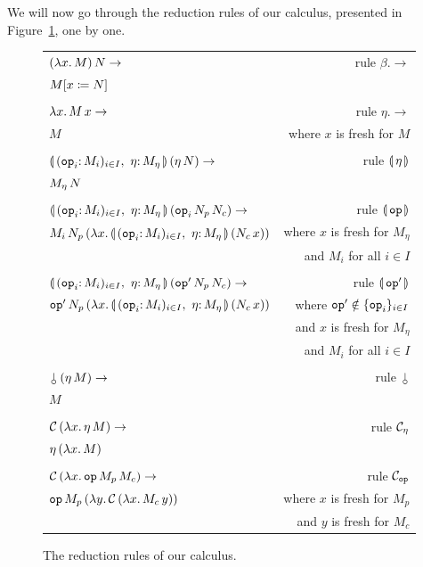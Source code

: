 We will now go through the reduction rules of our calculus, presented in
Figure~\ref{fig:reductions}, one by one.


\begin{figure}
  \centering
  \begin{tabular}{lr}
  $(\lambda x.\, M)\,N \to$ & rule $\beta.\to$ \\
  $M[x \coloneqq N]$ & \\
  \\
  $\lambda x.\, M\,x \to$ & rule $\eta.\to$ \\
  $M$ & where $x$ is fresh for $M$ \\
  \\
  $\ap{\cibanana}{(\ap{\eta}{N})} \to$ & rule $\llparenthesis \, \eta \, \rrparenthesis$ \\
  $M_\eta\,N$ & \\
  \\
  $\ap{\cibanana}{(\ap{\ap{\op{op}_i}{N_p}}{N_c})} \to$ & rule $\llparenthesis \, \mathtt{op} \, \rrparenthesis$ \\
  $\ap{M_i}{\ap{N_p}{(\lam{x}{\ap{\cibanana}{(\ap{N_c}{x})}})}}$
  & where $x$ is fresh for $M_\eta$ \\ & and $M_i$ for all $i \in I$ \\
  \\
  $\ap{\cibanana}{(\ap{\ap{\op{op}'}{N_p}}{N_c})} \to$ & rule $\llparenthesis \, \mathtt{op}' \, \rrparenthesis$ \\
  $\ap{\op{op}'}{\ap{N_p}{(\lam{x}{\ap{\cibanana}{(\ap{N_c}{x})}})}}$
  & where $\mathtt{op}' \notin \{\mathtt{op}_i\}_{i \in I}$ \\
  & and $x$ is fresh for $M_\eta$ \\ & and $M_i$ for all $i \in I$ \\
  \\
  $\ap{\cherry}{(\ap{\eta}{M})} \to$ & rule $\cherry$ \\
  $M$ & \\
  \\
  $\mathcal{C}\,(\lambda x.\, \eta\,M) \to$ & rule $\mathcal{C}_\eta$ \\
  $\eta\,(\lambda x.\, M)$ & \\
  \\
  $\mathcal{C}\,(\lambda x.\, \mathtt{op}\,M_p\,M_c) \to$ & rule $\mathcal{C}_{\mathtt{op}}$ \\
  $\mathtt{op}\,M_p\,(\lambda y.\, \mathcal{C}\,(\lambda x.\, M_c\,y))$
  & where $x$ is fresh for $M_p$ \\ & and $y$ is fresh for $M_c$
  \end{tabular}
  
  \caption{\label{fig:reductions} The reduction rules of our calculus.}
\end{figure}



